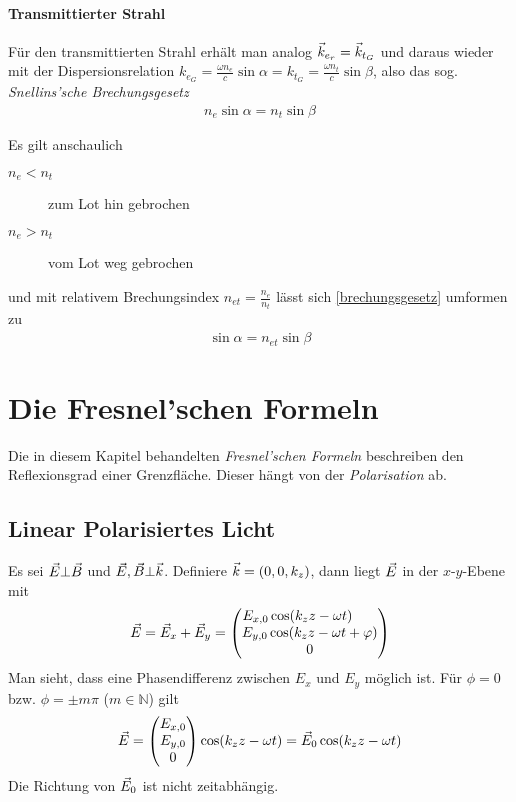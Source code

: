 \paragraph{Transmittierter Strahl} Für den transmittierten Strahl
erhält man analog $\vec{k}_{e_r} = \vec{k}_{t_G}$ und daraus wieder mit
der Dispersionsrelation
$k_{e_G} = \frac{\omega n_e}{c}\sin\alpha 
= k_{t_G} =  \frac{\omega n_t}{c}\sin\beta$, also das sog.
\emph{Snellins'sche  Brechungsgesetz}%
\begin{gather}
  n_e\sin\alpha = n_t\sin\beta
  \label{brechungsgesetz}
\end{gather}

Es gilt anschaulich
\begin{description}
\item[$n_e<n_t$] zum Lot hin gebrochen
\item[$n_e>n_t$] vom Lot weg gebrochen
\end{description}
und mit relativem Brechungsindex $n_{et}=\frac{n_e}{n_t}$ lässt sich
\eqref{brechungsgesetz} umformen zu
\begin{gather*}
  \sin\alpha = n_{et} \sin\beta
\end{gather*}


\section{Die Fresnel'schen Formeln}
Die in diesem Kapitel behandelten 
\emph{Fresnel'schen Formeln}
beschreiben den Reflexionsgrad einer Grenzfläche.
Dieser hängt von der \emph{Polarisation} ab.

\subsection{Linear Polarisiertes Licht}%
Es sei $\vec{E}\bot\vec{B}$ und $\vec{E},\vec{B}\bot\vec{k}$.
Definiere $\vec{k}= (0,0,k_z)$, dann liegt $\vec{E}$ in der $x$-$y$-Ebene
mit
\begin{gather*}
  \vec{E} = \vec{E}_x + \vec{E}_y 
  =\begin{pmatrix}
    E_{x,0} \cos(k_z z - \omega t)\phantom{~+ \varphi}\\
    E_{y,0} \cos(k_z z - \omega t + \varphi)\\
    0
  \end{pmatrix}
\end{gather*}
Man sieht, dass eine Phasendifferenz zwischen $E_x$ und $E_y$
möglich ist. Für $\phi=0$ bzw. $\phi=\pm m\pi$ ($m\in\mathds{N}$) gilt
\begin{gather*}
  \vec{E} = \begin{pmatrix} E_{x,0}\\E_{y,0}\\0 \end{pmatrix}
  \cos(k_zz - \omega t)
  = \vec{E}_0  \cos(k_zz - \omega t)
\end{gather*}
Die Richtung von $\vec{E}_0$ ist nicht zeitabhängig.

